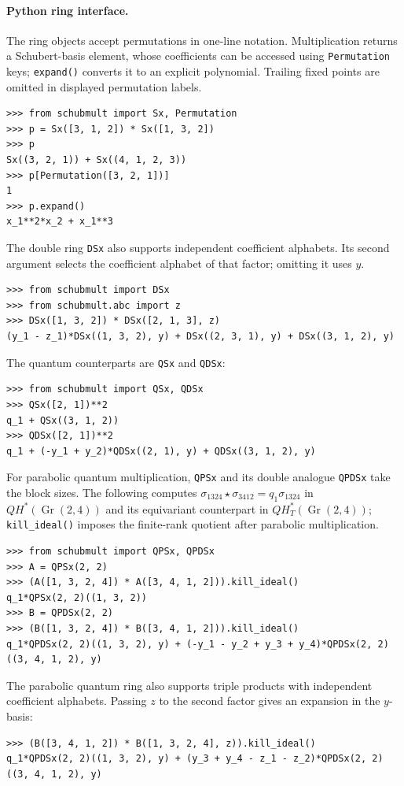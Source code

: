 \documentclass{amsart}
\theoremstyle{definition}
\theoremstyle{remark}
\numberwithin{equation}{section}
\begin{document}
\paragraph{Python ring interface.}
The ring objects accept permutations in one-line notation.
Multiplication returns a Schubert-basis element, whose coefficients
can be accessed using \texttt{Permutation} keys; \texttt{expand()}
converts it to an explicit polynomial. Trailing fixed points are
omitted in displayed permutation labels.
\begin{verbatim}
>>> from schubmult import Sx, Permutation
>>> p = Sx([3, 1, 2]) * Sx([1, 3, 2])
>>> p
Sx((3, 2, 1)) + Sx((4, 1, 2, 3))
>>> p[Permutation([3, 2, 1])]
1
>>> p.expand()
x_1**2*x_2 + x_1**3
\end{verbatim}
The double ring \texttt{DSx} also supports independent coefficient
alphabets. Its second argument selects the coefficient alphabet of
that factor; omitting it uses $y$.
\begin{verbatim}
>>> from schubmult import DSx
>>> from schubmult.abc import z
>>> DSx([1, 3, 2]) * DSx([2, 1, 3], z)
(y_1 - z_1)*DSx((1, 3, 2), y) + DSx((2, 3, 1), y) + DSx((3, 1, 2), y)
\end{verbatim}
The quantum counterparts are \texttt{QSx} and \texttt{QDSx}:
\begin{verbatim}
>>> from schubmult import QSx, QDSx
>>> QSx([2, 1])**2
q_1 + QSx((3, 1, 2))
>>> QDSx([2, 1])**2
q_1 + (-y_1 + y_2)*QDSx((2, 1), y) + QDSx((3, 1, 2), y)
\end{verbatim}
For parabolic quantum multiplication, \texttt{QPSx} and its double
analogue \texttt{QPDSx} take the block sizes. The following computes
$\sigma_{1324}\star\sigma_{3412}=q_1\sigma_{1324}$ in
$QH^*(\operatorname{Gr}(2,4))$ and its equivariant counterpart in
$QH_T^*(\operatorname{Gr}(2,4))$; \texttt{kill\_ideal()} imposes the
finite-rank quotient after parabolic multiplication.
\begin{verbatim}
>>> from schubmult import QPSx, QPDSx
>>> A = QPSx(2, 2)
>>> (A([1, 3, 2, 4]) * A([3, 4, 1, 2])).kill_ideal()
q_1*QPSx(2, 2)((1, 3, 2))
>>> B = QPDSx(2, 2)
>>> (B([1, 3, 2, 4]) * B([3, 4, 1, 2])).kill_ideal()
q_1*QPDSx(2, 2)((1, 3, 2), y) + (-y_1 - y_2 + y_3 + y_4)*QPDSx(2, 2)((3, 4, 1, 2), y)
\end{verbatim}
The parabolic quantum ring also supports triple products with
independent coefficient alphabets. Passing $z$ to the second factor
gives an expansion in the $y$-basis:
\begin{verbatim}
>>> (B([3, 4, 1, 2]) * B([1, 3, 2, 4], z)).kill_ideal()
q_1*QPDSx(2, 2)((1, 3, 2), y) + (y_3 + y_4 - z_1 - z_2)*QPDSx(2, 2)((3, 4, 1, 2), y)
\end{verbatim}
\end{document}
